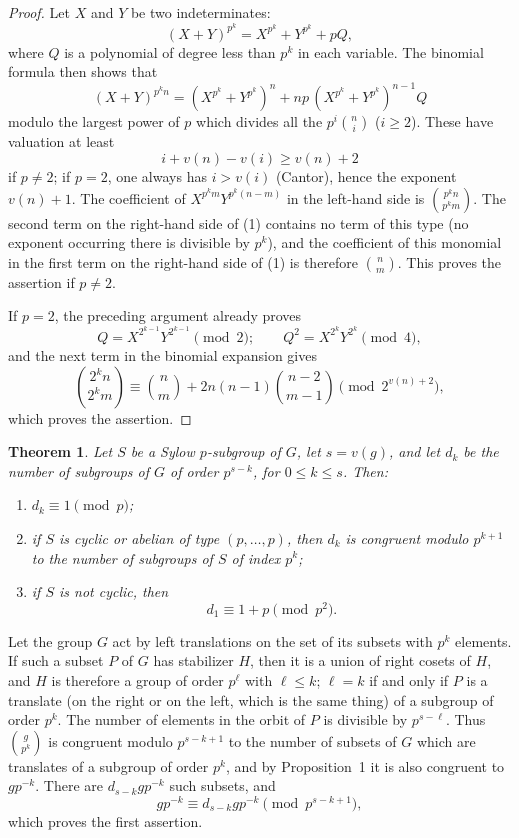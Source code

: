 \documentclass[11pt]{article}
\newtheorem*{theorem*}{Theorem}
\begin{document}
\begin{proof}
Let \(X\) and \(Y\) be two indeterminates:
\[
        (X+Y)^{p^k}=X^{p^k}+Y^{p^k}+pQ,
\]
where \(Q\) is a polynomial of degree less than \(p^k\) in each variable. The
binomial formula then shows that
\begin{equation}
 (X+Y)^{p^k n}
 =(X^{p^k}+Y^{p^k})^n+
 np\,(X^{p^k}+Y^{p^k})^{n-1}Q
\tag{1}
\end{equation}
modulo the largest power of \(p\) which divides all the
\(p^i\binom{n}{i}\) (\(i\geq2\)). These have valuation at least
\[
        i+v(n)-v(i)\geq v(n)+2
\]
if \(p\neq2\); if \(p=2\), one always has \(i>v(i)\) (Cantor), hence the
exponent \(v(n)+1\). The coefficient of \(X^{p^k m}Y^{p^k(n-m)}\) in the
left-hand side is \(\binom{p^k n}{p^k m}\). The second term on the right-hand
side of (1) contains no term of this type (no exponent occurring there is
divisible by \(p^k\)), and the coefficient of this monomial in the first term
on the right-hand side of (1) is therefore \(\binom{n}{m}\). This proves the
assertion if \(p\neq2\).

If \(p=2\), the preceding argument already proves
\[
        Q=X^{2^{k-1}}Y^{2^{k-1}}\pmod 2;
        \qquad Q^2=X^{2^k}Y^{2^k}\pmod 4,
\]
and the next term in the binomial expansion gives
\[
        \binom{2^k n}{2^k m}
        \equiv \binom{n}{m}
        +2n(n-1)\binom{n-2}{m-1}
        \pmod {2^{v(n)+2}},
\]
which proves the assertion.
\end{proof}

\begin{theorem*}
Let \(S\) be a Sylow \(p\)-subgroup of \(G\), let \(s=v(g)\), and let \(d_k\)
be the number of subgroups of \(G\) of order \(p^{s-k}\), for \(0\leq k\leq s\).
Then:
\begin{enumerate}[label=(\roman*)]
\item \(d_k\equiv1\pmod p\);
\item if \(S\) is cyclic or abelian of type \((p,\ldots,p)\), then \(d_k\) is
congruent modulo \(p^{k+1}\) to the number of subgroups of \(S\) of index
\(p^k\);
\item if \(S\) is not cyclic, then
\[
        d_1\equiv1+p\pmod {p^2}.
\]
\end{enumerate}
\end{theorem*}

Let the group \(G\) act by left translations on the set of its subsets with
\(p^k\) elements. If such a subset \(P\) of \(G\) has stabilizer \(H\), then it
is a union of right cosets of \(H\), and \(H\) is therefore a group of order
\(p^\ell\) with \(\ell\leq k\); \(\ell=k\) if and only if \(P\) is a translate
(on the right or on the left, which is the same thing) of a subgroup of order
\(p^k\). The number of elements in the orbit of \(P\) is divisible by
\(p^{s-\ell}\). Thus \(\binom{g}{p^k}\) is congruent modulo \(p^{s-k+1}\) to
the number of subsets of \(G\) which are translates of a subgroup of order
\(p^k\), and by Proposition~1 it is also congruent to \(gp^{-k}\). There are
\(d_{s-k}gp^{-k}\) such subsets, and
\[
        gp^{-k}\equiv d_{s-k}gp^{-k}\pmod {p^{s-k+1}},
\]
which proves the first assertion.
\end{document}
